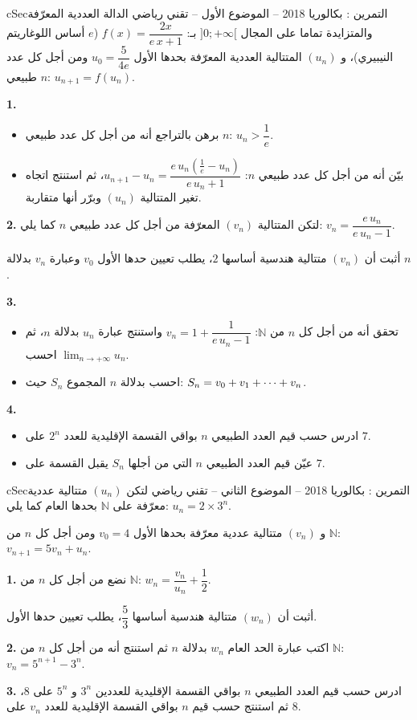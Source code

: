 \documentclass[12pt,a4paper]{article}
\newenvironment{BOX}[2]{\begin{otherlanguage}{english}\begin{arbox}{#1}{#2}}{\end{arbox}\end{otherlanguage}}
\newcounter{exo}
\newenvironment{tamrin}[1]{\stepcounter{exo}\begin{BOX}{cSec}{التمرين \theexo: #1}}{\end{BOX}}
\renewcommand{\cdots}{\mathinner{\cdotp\cdotp\cdotp}}
\newcommand{\N}{\mathbb{N}}
\newcommand{\limn}{\displaystyle\lim_{n\to+\infty}}
\newenvironment{sq}{\begin{itemize}[leftmargin=2.4em,itemsep=3pt]}{\end{itemize}}
\newcommand{\qa}{\item[(أ)]}\newcommand{\qb}{\item[(ب)]}\newcommand{\qc}{\item[(جـ)]}\newcommand{\qd}{\item[(د)]}\newcommand{\qe}{\item[(هـ)]}
\newcommand{\QQ}[1]{\par\smallskip\textbf{#1.} }
\begin{document}
\begin{tamrin}{بكالوريا 2018 -- الموضوع الأول -- تقني رياضي}
الدالة العددية المعرّفة والمتزايدة تماما على المجال $]0;+\infty[$ بـ: $f(x)=\dfrac{2x}{e\,x+1}$ ($e$ أساس اللوغاريتم النيبيري)،
و $(u_n)$ المتتالية العددية المعرّفة بحدها الأول $u_0=\dfrac{5}{4e}$ ومن أجل كل عدد طبيعي $n$: $u_{n+1}=f(u_n)$.

\QQ{1}
\begin{sq}
\qa برهن بالتراجع أنه من أجل كل عدد طبيعي $n$: $u_n>\dfrac1e$.
\qb بيّن أنه من أجل كل عدد طبيعي $n$: $u_{n+1}-u_n=\dfrac{e\,u_n\left(\frac1e-u_n\right)}{e\,u_n+1}$، ثم استنتج اتجاه تغير المتتالية $(u_n)$ وبرّر أنها متقاربة.
\end{sq}

\QQ{2} لتكن المتتالية $(v_n)$ المعرّفة من أجل كل عدد طبيعي $n$ كما يلي: $v_n=\dfrac{e\,u_n}{e\,u_n-1}$.

أثبت أن $(v_n)$ متتالية هندسية أساسها $2$، يطلب تعيين حدها الأول $v_0$ وعبارة $v_n$ بدلالة $n$.

\QQ{3}
\begin{sq}
\qa تحقق أنه من أجل كل $n$ من $\N$: $v_n=1+\dfrac{1}{e\,u_n-1}$ واستنتج عبارة $u_n$ بدلالة $n$، ثم احسب $\limn u_n$.
\qb احسب بدلالة $n$ المجموع $S_n$ حيث: $S_n=v_0+v_1+\cdots+v_n$.
\end{sq}

\QQ{4}
\begin{sq}
\qa ادرس حسب قيم العدد الطبيعي $n$ بواقي القسمة الإقليدية للعدد $2^n$ على $7$.
\qb عيّن قيم العدد الطبيعي $n$ التي من أجلها $S_n$ يقبل القسمة على $7$.
\end{sq}
\end{tamrin}

\begin{tamrin}{بكالوريا 2018 -- الموضوع الثاني -- تقني رياضي}
لتكن $(u_n)$ متتالية عددية معرّفة على $\N$ بحدها العام كما يلي: $u_n=2\times3^n$.

و $(v_n)$ متتالية عددية معرّفة بحدها الأول $v_0=4$ ومن أجل كل $n$ من $\N$: $v_{n+1}=5v_n+u_n$.

\QQ{1} نضع من أجل كل $n$ من $\N$: $w_n=\dfrac{v_n}{u_n}+\dfrac12$.

أثبت أن $(w_n)$ متتالية هندسية أساسها $\dfrac53$، يطلب تعيين حدها الأول.

\QQ{2} اكتب عبارة الحد العام $w_n$ بدلالة $n$ ثم استنتج أنه من أجل كل $n$ من $\N$: $v_n=5^{n+1}-3^n$.

\QQ{3} ادرس حسب قيم العدد الطبيعي $n$ بواقي القسمة الإقليدية للعددين $3^n$ و $5^n$ على $8$، ثم استنتج حسب قيم $n$ بواقي القسمة الإقليدية للعدد $v_n$ على $8$.
\end{tamrin}
\end{document}
